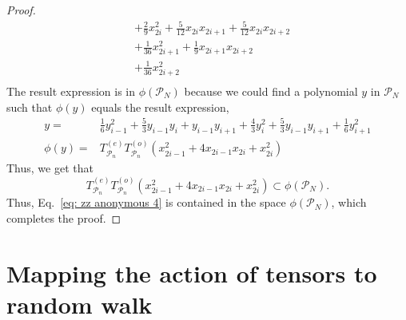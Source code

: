 \documentclass{article}
\newcommand{\Twhole}{T^{(\text{whole})}}
\newcommand{\supket}[1]{|#1 \rangle\rangle}
\begin{document}
\begin{proof}
\begin{equation}
\begin{aligned}
        & + \frac{2}{9}x_{2i}^2 + \frac{5}{12} x_{2i}x_{2i+1} + \frac{5}{12} x_{2i}x_{2i+2}\\
        & + \frac{1}{36}x_{2i+1}^2  + \frac{1}{9} x_{2i+1}x_{2i+2}\\
        & + \frac{1}{36}x_{2i+2}^2 \\
    \end{aligned}
    \end{equation}
    The result expression is in $\phi(\mathcal{P}_N)$ because we could find a polynomial $y$ in $\mathcal{P}_N$ such that $\phi(y)$ equals the result expression,
    \begin{align}
        y =& \frac{1}{6} y_{i-1}^2 + \frac{5}{3} y_{i-1}y_{i} + y_{i-1}y_{i+1} + \frac{4}{3} y_{i}^2 + \frac{5}{3} y_{i-1}y_{i+1}  + \frac{1}{6} y_{i+1}^2 \\
        \phi(y) =& T^{(e)}_{\mathcal{P}_n}T^{(o)}_{\mathcal{P}_n} ( x_{2i-1}^2+4 x_{2i-1} x_{2i}+x_{2i}^2)
    \end{align}
    Thus, we get that 
    \begin{equation}
        T^{(e)}_{\mathcal{P}_n}T^{(o)}_{\mathcal{P}_n} ( x_{2i-1}^2+4 x_{2i-1} x_{2i}+x_{2i}^2) \subset \phi(\mathcal{P}_N).
    \end{equation}
    Thus, Eq.~\eqref{eq: zz anonymous 4} is contained in the space $\phi(\mathcal{P}_N)$, which completes the proof.
\end{proof}



\section{Mapping the action of tensors to random walk}
\label{sec: mapping the action of tensors to random walk}
\end{document}
